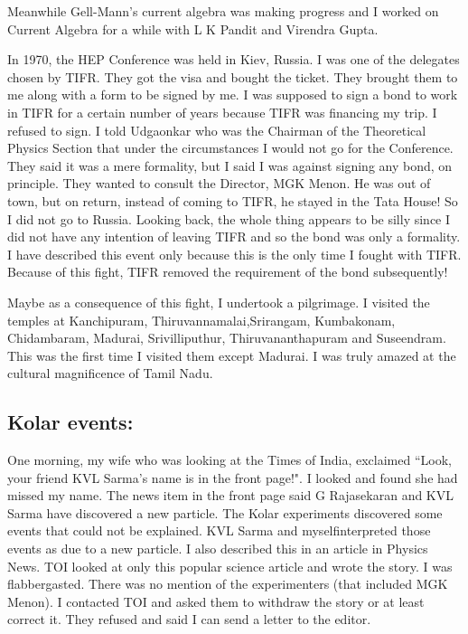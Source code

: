 Meanwhile Gell-Mann's current algebra was making progress and I worked 
on Current Algebra for a while with L K Pandit and Virendra Gupta.

In 1970, the HEP Conference was held in Kiev, Russia. I was one of the 
delegates chosen by TIFR. They got the visa and bought the ticket. They 
brought them to me along with a form to be signed by me. I was supposed 
to sign a bond to work in TIFR for a certain number of years because 
TIFR was financing my trip. I refused to sign. I told Udgaonkar who was 
the Chairman of the Theoretical Physics Section that under the 
circumstances I would not go for the Conference. They said it was a mere 
formality, but I said I was against signing any bond, on principle. They 
wanted to consult the Director, MGK Menon. He was out of town, but on 
return, instead of coming to TIFR, he stayed in the Tata House! So I did 
not go to Russia. Looking back, the whole thing appears to be silly 
since I did not have any intention of leaving TIFR and so the bond was 
only a formality. I have described this event only because this is the 
only time I fought with TIFR. Because of this fight, TIFR removed the 
requirement of the bond subsequently!
\smallskip

Maybe as a consequence of this fight, I undertook a pilgri\-mage. I 
visited the temples at Kanchipuram, Thiruvannamalai,\break Srirangam, 
Kumbakonam, Chidambaram, Madurai, Srivilliputhur, Thiruvananthapuram and 
Suseendram. This was the first time I visited them except Madurai. I was 
truly amazed at the cultural magnificence of Tamil Nadu.

\subsection*{Kolar events:}

One morning, my wife who was looking at the Times of India, exclaimed 
``Look, your friend KVL Sarma's name is in the front page!". I looked and 
found she had missed my name. The news item in the front page said G 
Rajasekaran and KVL Sarma have discovered a new particle. The Kolar 
experiments discovered some events that could not be explained. KVL 
Sarma and myself\break interpreted those events as due to a new particle. I 
also described this in an article in Physics News. TOI looked at only 
this popular science article and wrote the story. I was flabbergasted. 
There was no mention of the experimenters (that included MGK Menon). I 
contacted TOI and asked them to withdraw the story or at least correct 
it. They refused and said I can send a letter to the editor.

